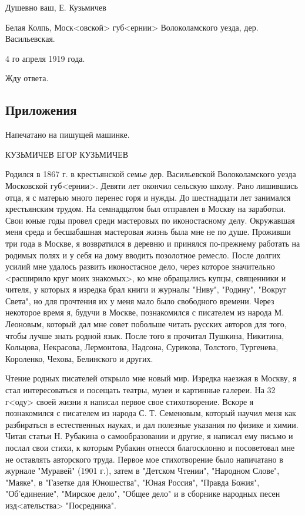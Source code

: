 \documentclass[]{memoir}
\begin{document}
Душевно ваш, Е. Кузьмичев

Белая Колпь, Моск<овской> губ<ернии> Волоколамского уезда, дер. Васильевская.

4 го апреля 1919 года.

Жду ответа.



\subsection{Приложения}

Напечатано на пишущей машинке.

КУЗЬМИЧЕВ ЕГОР КУЗЬМИЧЕВ

Родился в 1867 г. в крестьянской семье дер. Васильевской Волоколамского уезда Московской губ<ернии>. Девяти лет окончил сельскую школу. Рано лишившись отца, я с матерью много перенес горя и нужды. До шестнадцати лет занимался крестьянским трудом. На семнадцатом был отправлен в Москву на заработки. Свои юные годы провел среди мастеровых по иконостасному делу. Окружавшая меня среда и бесшабашная мастеровая жизнь была мне не по душе. Проживши три года в Москве, я возвратился в деревню и принялся по-прежнему работать на родимых полях и у себя на дому вводить позолотное ремесло. После долгих усилий мне удалось развить иконостасное дело, через которое значительно <расширило круг моих знакомых>, ко мне обращались купцы, священники и чителя, у которых я изредка брал книги и журналы "Ниву", "Родину", "Вокруг Света", но для прочтения их у меня мало было свободного времени. Через некоторое время я, будучи в Москве, познакомился с писателем из народа М. Леоновым, который дал мне совет побольше читать русских авторов для того, чтобы лучше знать родной язык. После того я прочитал Пушкина, Никитина, Кольцова, Некрасова, Лермонтова, Надсона, Сурикова, Толстого, Тургенева, Короленко, Чехова, Белинского и других.

Чтение родных писателей открыло мне новый мир. Изредка наезжая в Москву, я стал интересоваться и посещать театры, музеи и картинные галереи. На 32 г<оду> своей жизни я написал первое свое стихотворение. Вскоре я познакомился с писателем из народа С. Т. Семеновым, который научил меня как разбираться в естественных науках, и дал полезные указания по физике и химии. Читая статьи Н. Рубакина о самообразовании и другие, я написал ему письмо и послал свои стихи, к которым Рубакин отнесся благосклонно и посоветовал мне не оставлять авторского труда. Первое мое стихотворение было напичатано в журнале "Муравей" (1901 г.), затем в "Детском Чтении", "Народном Слове", "Маяке", в "Газетке для Юношества", "Юная Россия", "Правда Божия", "Об'единение", "Мирское дело", "Общее дело" и в сборнике народных песен изд<ательства> "Посредника". 
\end{document}
